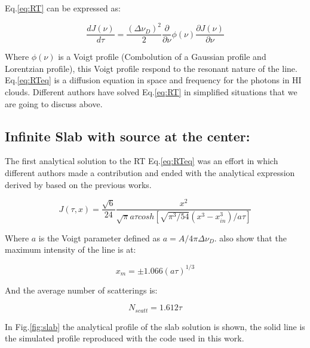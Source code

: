 Eq.\ref{eq:RT} can be expressed as: 

\begin{equation}\label{eq:RTeq}
\dfrac{dJ(\nu)}{d\tau} = \dfrac{(\Delta \nu_D)^2}{2}\dfrac{\partial}{\partial \nu}\phi(\nu)\dfrac{\partial J(\nu)}{\partial \nu}
\end{equation}

Where $\phi(\nu)$ is a Voigt profile (Combolution of a Gaussian profile  
and Lorentzian profile), this Voigt profile respond to the resonant nature 
of the line. Eq.\ref{eq:RTeq} is a diffusion equation in space and frequency
for the \ly photons in HI clouds. Different authors have solved 
Eq.\ref{eq:RT} in simplified situations that we are going to discuss above. 

\subsection{Infinite Slab with \ly source at the center:}

The first analytical solution to the RT Eq.\ref{eq:RTeq}
was an effort in which different authors made a contribution \citep{Unno55, Osterbrock62, Adams72, Harrington73} and ended with the analytical expression
derived by \citep{Neufeld90} based on the previous works. 

\begin{equation}
J(\tau, x) = \dfrac{\sqrt{6}}{24}\dfrac{x^2}{\sqrt{\pi}a\tau cosh[\sqrt{\pi^3/54}(x^3-x_{in}^3)/a\tau]}
\end{equation}

Where $a$ is the Voigt parameter defined as $a=A/4\pi\Delta \nu_D$. \citep{Harrington73} also show that the maximum intensity of the line is at:

\begin{equation}
x_m = \pm1.066(a\tau)^{1/3}
\end{equation}

And the average number of scatterings is:

\begin{equation}
N_{scatt} = 1.612\tau
\end{equation}

In Fig.\ref{fig:slab} the analytical profile of the slab solution is shown, 
the solid line is the simulated profile reproduced with \citep{CLARA} the code
used in this work.

